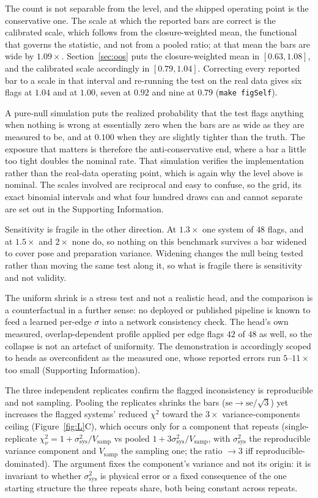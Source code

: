 The count is not separable from the level, and the shipped operating point is the conservative one.
The scale at which the reported bars are correct is the calibrated scale, which follows from the
closure-weighted mean, the functional that governs the statistic, and not from a pooled ratio; at
that mean the bars are wide by $1.09\times$. Section~\ref{sec:oos} puts the closure-weighted mean
in $[0.63,1.08]$, and the calibrated scale accordingly in $[0.79,1.04]$. Correcting every
reported bar to a scale in that interval and re-running the test on the real data gives six flags
at $1.04$ and at $1.00$, seven at $0.92$ and nine at $0.79$ (\texttt{make figSelf}).

A pure-null simulation puts the realized probability that the test flags anything when nothing is
wrong at essentially zero when the bars are as wide as they are measured to be, and at $0.100$
when they are slightly tighter than the truth. The exposure that matters is therefore the
anti-conservative end, where a bar a little too tight doubles the nominal rate. That simulation
verifies the implementation rather than the real-data operating point, which is again why the
level above is nominal. The scales involved are reciprocal and easy to confuse, so the grid, its
exact binomial intervals and what four hundred draws can and cannot separate are set out in the
Supporting Information.

Sensitivity is fragile in the other direction. At $1.3\times$ one system of $48$ flags, and at
$1.5\times$ and $2\times$ none do, so nothing on this benchmark survives a bar widened to cover
pose and preparation variance. Widening changes the null being tested rather than moving the same
test along it, so what is fragile there is sensitivity and not validity.

The uniform shrink is a stress test and not a realistic head, and the comparison is a
counterfactual in a further sense: no deployed or published pipeline is known to feed a learned
per-edge $\sigma$ into a network consistency check. The head's own measured, overlap-dependent
profile applied per edge flags $42$ of $48$ as well, so the collapse is not an artefact of
uniformity. The demonstration is accordingly scoped to heads as overconfident as the measured one,
whose reported errors run $5$--$11\times$ too small (Supporting Information).

The three independent replicates confirm the flagged inconsistency is reproducible and not
sampling. Pooling the replicates shrinks the bars ($\mathrm{se}\to\mathrm{se}/\sqrt3$) yet increases the flagged
systems' reduced $\chi^2$ toward the $3\times$ variance-components ceiling (Figure~\ref{fig:L}C),
which occurs only for a component that repeats (single-replicate
$\chi^2_\nu=1+\sigma^2_{\text{sys}}/V_{\text{samp}}$ vs
pooled $1+3\sigma^2_{\text{sys}}/V_{\text{samp}}$, with $\sigma^2_{\text{sys}}$ the reproducible
variance component and $V_{\text{samp}}$ the sampling one; the ratio $\to3$ iff
reproducible-dominated). The argument fixes the component's variance and not its origin: it is
invariant to whether $\sigma^2_{\text{sys}}$ is physical error or a fixed consequence of the one
starting structure the three repeats share, both being constant across repeats.

